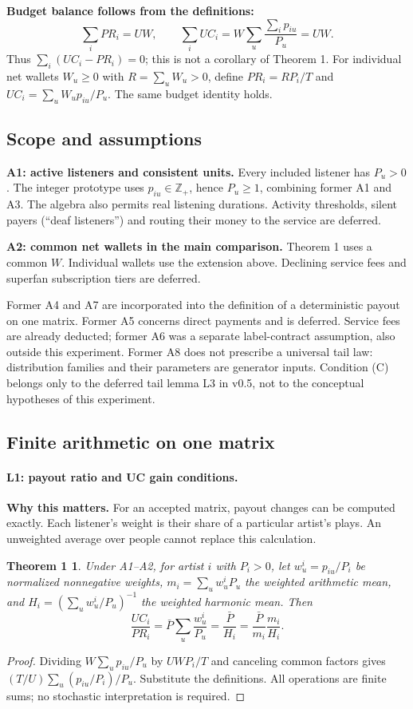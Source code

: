 \documentclass[11pt]{article}
\newcommand{\why}[1]{\par\medskip\noindent\textbf{Why this matters.} #1\par\medskip}
\newtheorem*{thmone}{Theorem 1}
\newcommand{\Pbar}{\bar P}
\begin{document}
\textbf{Budget balance follows from the definitions:}
\[
\sum_i PR_i=UW,\qquad
\sum_i UC_i=W\sum_u\frac{\sum_i p_{iu}}{P_u}=UW.
\]
Thus $\sum_i(UC_i-PR_i)=0$; this is not a corollary of Theorem 1.
For individual net wallets $W_u\ge0$ with $R=\sum_uW_u>0$, define
$PR_i=RP_i/T$ and $UC_i=\sum_u W_up_{iu}/P_u$. The same budget identity holds.

\subsection{Scope and assumptions}
\textbf{A1: active listeners and consistent units.} Every included listener
has $P_u>0$. The integer prototype uses $p_{iu}\in\mathbb Z_+$, hence
$P_u\ge1$, combining former A1 and A3. The algebra also permits real
listening durations. Activity thresholds, silent payers (``deaf listeners'')
and routing their money to the service are deferred.

\textbf{A2: common net wallets in the main comparison.} Theorem 1 uses a
common $W$. Individual wallets use the extension above. Declining service
fees and superfan subscription tiers are deferred.

Former A4 and A7 are incorporated into the definition of a deterministic
payout on one matrix. Former A5 concerns direct payments and is deferred.
Service fees are already deducted; former A6 was a separate label-contract
assumption, also outside this experiment. Former A8 does not prescribe a
universal tail law: distribution families and their parameters are generator
inputs. Condition (C) belongs only to the deferred tail lemma L3 in v0.5,
not to the conceptual hypotheses of this experiment.

\subsection{Finite arithmetic on one matrix}
\paragraph{L1: payout ratio and UC gain conditions.}
\why{For an accepted matrix, payout changes can be computed exactly. Each
listener's weight is their share of a particular artist's plays. An
unweighted average over people cannot replace this calculation.}

\begin{thmone}
Under A1--A2, for artist $i$ with $P_i>0$, let
$w^i_u=p_{iu}/P_i$ be normalized nonnegative weights,
$m_i=\sum_u w^i_uP_u$ the weighted arithmetic mean, and
$H_i=(\sum_u w^i_u/P_u)^{-1}$ the weighted harmonic mean. Then
\[
\frac{UC_i}{PR_i}
=\Pbar\sum_u\frac{w^i_u}{P_u}
=\frac{\Pbar}{H_i}
=\frac{\Pbar}{m_i}\frac{m_i}{H_i}.
\]
\end{thmone}
\begin{proof}
Dividing $W\sum_u p_{iu}/P_u$ by $UWP_i/T$ and canceling common factors\newline
gives $(T/U)\sum_u(p_{iu}/P_i)/P_u$. Substitute the definitions.
All operations are finite sums; no stochastic interpretation is required.
\end{proof}
\end{document}
